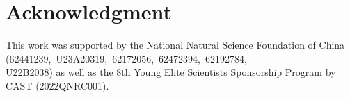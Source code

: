 \section*{Acknowledgment}
This work was supported by the National Natural Science Foundation of China (62441239,~U23A20319,~62172056,~62472394,~62192784, \\ U22B2038) as well as the 8th Young Elite Scientists Sponsorship Program by CAST (2022QNRC001).
